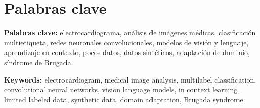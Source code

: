 \chapter*{Palabras clave}

\textbf{Palabras clave:} electrocardiograma, análisis de imágenes médicas, clasificación multietiqueta, redes neuronales convolucionales, modelos de visión y lenguaje, aprendizaje en contexto, pocos datos, datos sintéticos, adaptación de dominio, síndrome de Brugada.

\vspace{1.2cm}

\textbf{Keywords:} electrocardiogram, medical image analysis, multilabel classification, convolutional neural networks, vision language models, in context learning, limited labeled data, synthetic data, domain adaptation, Brugada syndrome.
